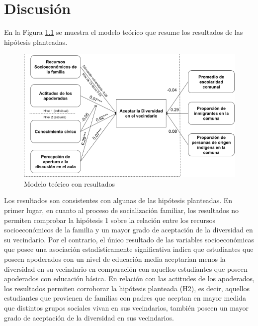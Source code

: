 \documentclass[12pt,twoside]{templates/facsothesis}
\begin{document}
\hypertarget{discusiuxf3n}{%
\chapter{Discusión}\label{discusiuxf3n}}

En la Figura \ref{fig:hipotesis2} se muestra el modelo teórico que resume los resultados de las hipótesis planteadas.

\begin{figure}[!ht]

{\centering \includegraphics[width=1\linewidth,]{images/modelo_resultados} 

}

\caption{Modelo teórico con resultados}\label{fig:hipotesis2}
\end{figure}

Los resultados son consistentes con algunas de las hipótesis planteadas. En primer lugar, en cuanto al proceso de socialización familiar, los resultados no permiten comprobar la hipótesis 1 sobre la relación entre los recursos socioeconómicos de la familia y un mayor grado de aceptación de la diversidad en su vecindario. Por el contrario, el único resultado de las variables socioeconómicas que posee una asociación estadísticamente significativa indica que estudiantes que poseen apoderados con un nivel de educación media aceptarían menos la diversidad en su vecindario en comparación con aquellos estudiantes que poseen apoderados con educación básica. En relación con las actitudes de los apoderados, los resultados permiten corroborar la hipótesis planteada (H2), es decir, aquellos estudiantes que provienen de familias con padres que aceptan en mayor medida que distintos grupos sociales vivan en sus vecindarios, también poseen un mayor grado de aceptación de la diversidad en sus vecindarios.
\end{document}
